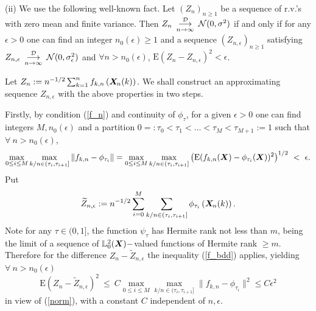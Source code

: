 \documentclass[10pt]{article}
\def\L{\mathbb{L}}
\def\E{\mathrm E}
\newcommand{\mbf}[1]{\mbox{\boldmath $#1$}}
\def\limiteloin{\renewcommand{\arraystretch}{0.5}
\begin{array}[t]{c}
\stackrel{{\cal D}}{\longrightarrow} \\
{\scriptstyle n \rightarrow\infty}
\end{array}\renewcommand{\arraystretch}{1}}
\begin{document}
\noindent (ii)  We use the following well-known fact. Let $(Z_n)_{n
\ge 1} $ be a sequence of r.v.'s with zero mean and finite variance.
Then $Z_n   \limiteloin  {\mathcal N}(0, \sigma^2)$ if and only if
for any $\epsilon>0$ one can find an integer $n_0(\epsilon) \ge 1$
and a sequence $(Z_{n,\epsilon})_{n\ge 1}$ satisfying
$Z_{n,\epsilon} \limiteloin {\mathcal N}(0, \sigma^2_\epsilon)$ and
$\forall n > n_0(\epsilon)$, $ \E (Z_n - Z_{n,\epsilon})^2 <
\epsilon$.



 Let $Z_n := n^{-1/2} \sum_{k=1}^n f_{k,n}\left({\mbf
X}_{\! n}(k)\right) $. We shall construct an approximating sequence
$Z_{n,\epsilon}$ with the above properties in two steps.

Firstly, by condition (\ref{f_n}) and continuity of $\phi_\tau $,
for a given $\epsilon> 0$ one can find integers $M, n_0(\epsilon)
$ and a partition $0=:\tau_0 < \tau_1 < \dots < \tau_M <
\tau_{M+1} := 1$ such that $\forall \  n > n_0(\epsilon)$,
\begin{equation}
\max_{0\le i \le M} \max_{k/n \in (\tau_i, \tau_{i+1}]}\| f_{k,n}
- \phi_{\tau_i}\| =\max_{0\le i \le M} \max_{k/n \in (\tau_i,
\tau_{i+1}]}\big (\E ( f_{k,n}({\mbf X}) - \phi_{\tau_i}({\mbf
X}))^2\big) ^{1/2} \ < \ \epsilon. \label{norm}
\end{equation}
Put
$$
\widetilde Z_{n,\epsilon} := n^{-1/2} \sum_{i=0}^M \sum_{k/n \in
(\tau_i, \tau_{i+1}]} \phi_{\tau_i}\left({\mbf X}_{\!
n}(k)\right).
$$
Note for any $\tau \in (0,1]$, the function $\psi_\tau $ has
Hermite rank not less than $m$, being the limit of a sequence of $
\L^2_0({\mbf X})-$valued functions of Hermite rank $\ge m$.
Therefore for the difference $Z_n - \widetilde Z_{n,\epsilon}$ the
inequality (\ref{f_bdd}) applies, yielding $\forall \  n>
n_0(\epsilon)$
\begin{equation}
\E (Z_n - \widetilde Z_{n,\epsilon})^2 \ \le \  C \max_{0\le i \le
M} \max_{k/n \in (\tau_i, \tau_{i+1}]}\| f_{k,n} -
\phi_{\tau_i}\|^2 \leq   C \epsilon^2 \label{Z1approx}
\end{equation}
in view of (\ref{norm}), with a constant $C$ independent of $n,
\epsilon $.
\end{document}
